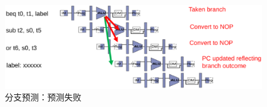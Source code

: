 \begin{figure}[htbp]
  \centering %
  \includegraphics[width=0.8 \textwidth]{figs/RISC-V/流水线/控制冒险_预测失败.eps}
  \caption{分支预测：预测失败}
  \label{fig:Control_Hazards_Fail} %
\end{figure}







